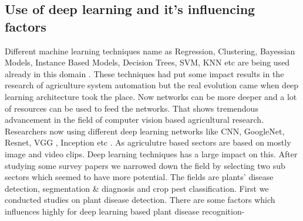 \subsection{Use of deep learning and it's influencing factors}
Different machine learning techniques name as Regression, Clustering, Bayessian Models, Instance Based Models, Decision Trees, SVM, KNN etc are being used already in this domain \cite{16_liakos2018machine}. These techniques had put some impact results in the research of agriculture system automation but the real evolution came when deep learning architecture took the place. Now networks can be more deeper and a lot of resources can be used to feed the networks. That shows tremendous advancement in the field of computer vision based agricultural research. Researchers now using different deep learning networks like CNN, GoogleNet, Resnet, VGG , Inception etc \cite{14_kamilaris2018deep}. As agriculutre based sectors are based on mostly image and video clips. Deep learning techniques has a large impact on this. After studying some survey papers we narrowed down the field by selecting two sub sectors which seemed to have more potential. The fields are plants' disease detection, segmentation \& diagnosis and crop pest classification. First we conducted studies on plant disease detection. There are some factors which influences highly for deep learning based plant disease recognition\cite{17_barbedo2018factors}-
